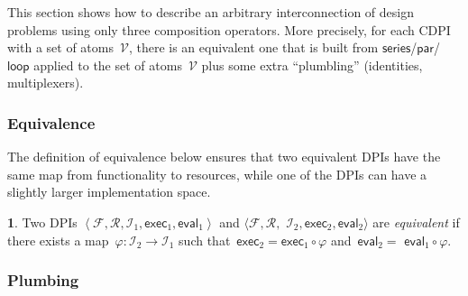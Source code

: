 \documentclass[twocolumn,english]{IEEEtran}
\theoremstyle{definition}
\newtheorem{defn}{\protect\definitionname}
\theoremstyle{plain}
\theoremstyle{definition}
\theoremstyle{remark}
\theoremstyle{definition}
\theoremstyle{plain}
\theoremstyle{plain}
\newcommand{\aword}[1]{\mathsf{#1}}
\newcommand{\vmath}[1]{\aword{#1}}
\newcommand{\funsp}{\mathscr{F}}
\newcommand{\impsp}{\mathscr{I}}
\newcommand{\exc}{\vmath{exec}}
\newcommand{\eval}{\vmath{eval}}
\newcommand{\ressp}{\mathscr{R}}
\newcommand{\dpseries}{\vmath{series}}
\newcommand{\dppar}{\vmath{par}}
\newcommand{\dploop}{\vmath{loop}}
\newcommand{\cdpiN}{\mathcal{V}}
\providecommand{\definitionname}{Definition}
\begin{document}
\label{sec:Decomposing2}This section shows how to describe an arbitrary
interconnection of design problems using only three composition operators.
More precisely, for each CDPI with a set of atoms~$\cdpiN$, there
is an equivalent one that is built from $\dpseries$/$\dppar$/$\dploop$
applied to the set of atoms~$\cdpiN$ plus some extra ``plumbling''
(identities, multiplexers).

\subsubsection*{Equivalence}

The definition of equivalence below ensures that two equivalent DPIs
have the same map from functionality to resources, while one of the
DPIs can have a slightly larger implementation space. 
\begin{defn}
Two DPIs $\left\langle \funsp,\ressp,\impsp_{1},\exc_{1},\eval_{1}\right\rangle $
and $\langle\funsp,\ressp,$ $\impsp_{2},\exc_{2},\eval_{2}\rangle$
are \emph{equivalent} if there exists a map~$\varphi:\impsp_{2}\rightarrow\impsp_{1}$
such that~$\exc_{2}=\exc_{1}\circ\varphi$ and~$\eval_{2}=$ $\eval_{1}\circ\varphi$.
\end{defn}

\subsubsection*{Plumbing}
\end{document}
